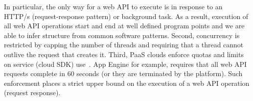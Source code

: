 In particular, the only way for a web API to execute is in response
to an HTTP/s (request-response 
pattern) or background task.  As a result, execution of
all web API operations start and end at well defined program points and
we are able to infer structure from common software patterns.  Second,
concurrency is restricted by capping the number of threads
and requiring that a thread cannot outlive the request
that creates it.  Third, PaaS clouds enforce quotas and limits on service
(cloud SDK) use~\cite{azure-limits,gae-limits,gae-sandbox}.
App Engine for example, requires that all web API requests complete in 60 seconds (or they are terminated by the platform).  Such enforcement places a strict upper bound on the
execution of a web API operation (request response).

